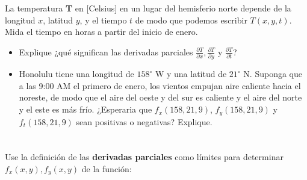 \documentclass[12pt]{article}
\begin{document}
\section{}

La temperatura \textbf{T} en [Celsius] en un lugar del hemisferio norte depende de la longitud $x$, latitud $y$, y el tiempo $t$ de modo que podemos escribir $T(x, y, t)$. Mida el tiempo en horas a partir del inicio de enero.

\begin{itemize}[format=\textbf]

\item Explique ¿qué significan las derivadas parciales $\frac{\partial T}{\partial x}, \frac{\partial T}{\partial y}$ y $\frac{\partial T}{\partial t}$?

\item Honolulu tiene una longitud de $158^{\circ}$ W y una latitud de $21^{\circ}$ N. Suponga que a las 9:00 AM el primero de enero, los vientos empujan aire caliente hacia el noreste, de modo que el aire del oeste y del sur es caliente y el aire del norte y el este es más frío. ¿Esperaria que $f_x(158, 21, 9)$, $f_y(158, 21, 9)$ y $f_t(158, 21, 9)$ sean positivas o
negativas? Explique.

\end{itemize}

\section{}

Use la definición de las \textbf{derivadas parciales} como límites para determinar $f_x(x, y), f_y(x, y)$ de la función:
\end{document}
